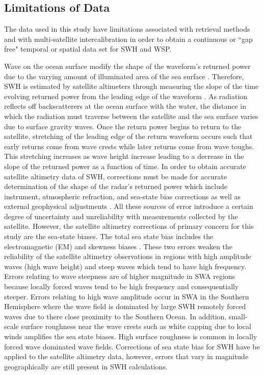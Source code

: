 \documentclass[12pt,twoside]{article}
\begin{document}
\subsection{Limitations of Data}

The data used in this study have limitations associated with retrieval methods and with multi-satellite intercalibration in order to obtain a continuous or ``gap free" temporal or spatial data set for SWH and WSP. 

Wave on the ocean surface modify the shape of the waveform's returned power due to the varying amount of illuminated area of the sea surface \cite{chelton2001satellite}. Therefore, SWH is estimated by satellite altimeters through measuring the slope of the time evolving returned power from the leading edge of the waveform \cite{chelton2001satellite}. As radiation reflects off backscatterers at the ocean surface with the water, the distance in which the radiation must traverse between the satellite and the sea surface varies due to surface gravity waves. Once the return power begins to return to the satellite, stretching of the leading edge of the return waveform occurs such that early returns come from wave crests while later returns come from wave toughs. This stretching increases as wave height increase leading to a decrease in the slope of the returned power as a function of time. In order to obtain accurate satellite altimetry data of SWH, corrections must be made for accurate determination of the shape of the radar's returned power which include instrument, atmospheric refraction, and sea-state bias corrections as well as external geophysical adjustments \cite{chelton2001satellite}. All these sources of error introduce a certain degree of uncertainty and unreliability with measurements collected by the satellite. However, the satellite altimetry corrections of primary concern for this study are the sea-state biases. The total sea state bias includes the electromagnetic (EM) and skewness biases \cite{chelton2001satellite}. These two errors weaken the reliability of the satellite altimetry observations in regions with high amplitude waves (high wave height) and steep waves which tend to have high frequency. Errors relating to wave steepness are of higher magnitude in SWA regions because locally forced waves tend to be high frequency and consequentially steeper. Errors relating to high wave amplitude occur in SWA in the Southern Hemisphere where the wave field is dominated by large SWH remotely forced waves due to there close proximity to the Southern Ocean. In addition, small-scale surface roughness near the wave crests such as white capping due to local winds amplifies the sea state biases. High surface roughness is common in locally forced wave dominated wave fields. Corrections of sea state bias for SWH have be applied to the satellite altimetry data, however, errors that vary in magnitude geographically are still present in SWH calculations.
\end{document}
